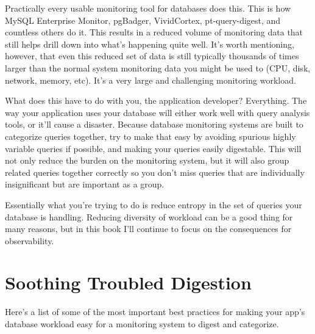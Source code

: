 \documentclass{vivid_layout}
\begin{document}
Practically every usable monitoring tool for databases does this. This is how
MySQL Enterprise Monitor, pgBadger, VividCortex, pt-query-digest, and countless
others do it. This results in a reduced volume of monitoring data that still
helps drill down into what's happening quite well. It's worth mentioning,
however, that even this reduced set of data is still typically thousands of
times larger than the normal system monitoring data you might be used to (CPU,
disk, network, memory, etc). It's a very large and challenging monitoring
workload.

What does this have to do with you, the application developer? Everything. The
way your application uses your database will either work well with query
analysis tools, or it'll cause a disaster.  Because database monitoring systems
are built to categorize queries together, try to make that easy by avoiding
spurious highly variable queries if possible, and making your queries easily
digestable. This will not only reduce the burden on the monitoring system, but
it will also group related queries together correctly so you don't miss queries
that are individually insignificant but are important as a group.

Essentially what you're trying to do is reduce entropy in the set of queries
your database is handling. Reducing diversity of workload can be a good thing
for many reasons, but in this book I'll continue to focus on the
consequences for observability.

\section{Soothing Troubled Digestion}

Here's a list of some of the most important best practices for making your app's
database workload easy for a monitoring system to digest and categorize.
\end{document}
